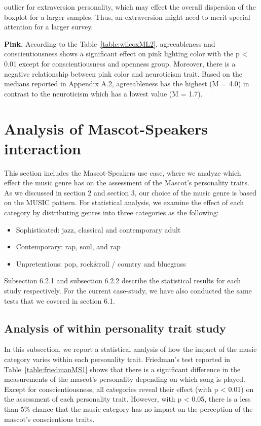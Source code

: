 outlier for extraversion personality, which may effect the overall dispersion of the boxplot for a larger samples.
Thus, an extraversion might need to merit special attention for a larger survey.
\par \textbf{Pink.} According to the Table~\ref{table:wilcoxML2}, agreeableness and conscientiousness shows a
significant effect on pink lighting color with the p < 0.01 except for conscientiousness and openness group.
Moreover, there is a negative relationship between pink color and neuroticism trait. Based on the medians reported in
Appendix A.2, agreeableness has the highest (M = 4.0) in contrast to the neuroticism which has a lowest value (M = 1.7).


\section{Analysis of Mascot-Speakers interaction}
\label{M-S}
This section includes the Mascot-Speakers use case, where we analyze which effect the music genre has on the assessment
of the Mascot’s personality traits. As we discussed in section 2 and section 3, our choice of the music genre is based
on the MUSIC pattern. For statistical analysis, we examine the effect of each category by distributing genres into
three categories as the following:
\begin{itemize}
  \item Sophisticated:  jazz, classical and contemporary adult
  \item Contemporary: rap, soul, and rap
  \item Unpretentious: pop, rock\&roll / country and bluegrass
\end{itemize}

Subsection 6.2.1 and subsection 6.2.2 describe the statistical results for each study respectively. For the current
case-study, we have also conducted the same tests that we covered in section 6.1.

\subsection{Analysis of within personality trait study}
\label{Study1(M-S)}
In this subsection, we report a statistical analysis of how the impact of the music category varies within each
personality trait. Friedman’s test reported in Table~\ref{table:friedmanMS1} shows that there is a significant
difference in the measurements of the mascot’s personality depending on which song is played. Except for conscientiousness,
all categories reveal their effect (with p < 0.01) on the assessment of each personality trait. However, with p < 0.05,
there is a less than 5\% chance that the music category has no impact on the perception of the mascot’s conscientious traits.

